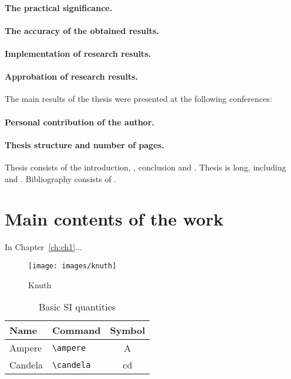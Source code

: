 \paragraph*{The practical significance.}
\paragraph*{The accuracy of the obtained results.}

\paragraph*{Implementation of research results.}
\paragraph*{Approbation of research results.}
The main results of the thesis were presented at the following conferences:
\printConferenceEN

\paragraph*{Personal contribution of the author.}
\paragraph*{Thesis structure and number of pages.}

Thesis consists of the introduction,
,
conclusion and 
.
Thesis is 
 long, including
 and
.
Bibliography consists of
.


\newpage
\section*{Main contents of the work}

In Chapter~\ref{ch:ch1}...

\begin{figure}
	\centering
	\texttt{[image: images/knuth]}
	\caption{Knuth}
\end{figure}
\begin{table}
	\centering
	\caption{Basic SI quantities}%
	\begin{tabular}{llc}
		\toprule
		Name 	& 	Command 	& 	Symbol         \\
		\midrule
		Ampere     & \verb|\ampere| & \si{\ampere}   \\
		Candela   & \verb|\candela| & \si{\candela}  \\
		\bottomrule
	\end{tabular}
\end{table}


